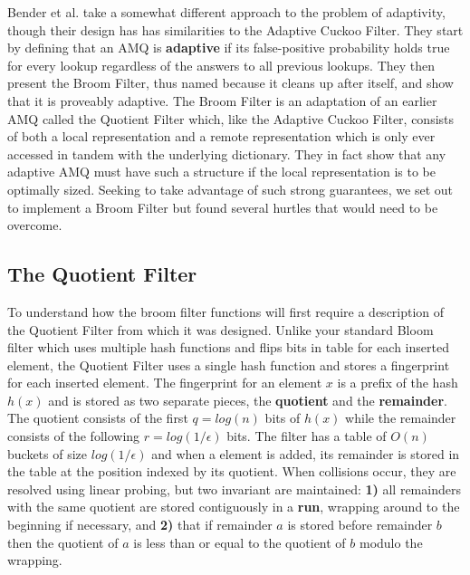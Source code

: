 \documentclass[../paper.tex]{subfiles}
\begin{document}
	Bender et al. \cite{broom-filter} take a somewhat different approach to the problem of adaptivity, though their design has has similarities to the Adaptive Cuckoo Filter.  They start by defining that an AMQ is {\bf adaptive} if its false-positive probability holds true for every lookup regardless of the answers to all previous lookups.  They then present the Broom Filter, thus named because it cleans up after itself, and show that it is proveably adaptive.  The Broom Filter is an adaptation of an earlier AMQ called the Quotient Filter \cite{quotient-filter} which, like the Adaptive Cuckoo Filter, consists of both a local representation and a remote representation which is only ever accessed in tandem with the underlying dictionary.   They in fact show that any adaptive AMQ must have such a structure if the local representation is to be optimally sized.  Seeking to take advantage of such strong guarantees, we set out to implement a Broom Filter but found several hurtles that would need to be overcome.  
	
\subsection{The Quotient Filter}
	To understand how the broom filter functions will first require a description of the Quotient Filter from which it was designed.   Unlike your standard Bloom filter which uses multiple hash functions and flips bits in table for each inserted element, the Quotient Filter uses a single hash function and stores a fingerprint for each inserted element.  The fingerprint for an element $x$ is a prefix of the hash $h(x)$ and is stored as two separate pieces, the {\bf quotient} and the {\bf remainder}.  The quotient consists of the first $q = log(n)$ bits of $h(x)$ while the remainder consists of the following $r = log(1/\epsilon)$ bits.  The filter has a table of $O(n)$ buckets of size $log(1/\epsilon)$ and when a element is added, its remainder is stored in the table at the position indexed by its quotient.  When collisions occur, they are resolved using linear probing, but two invariant are maintained: {\bf 1)} all remainders with the same quotient are stored contiguously in a {\bf run}, wrapping around to the beginning if necessary, and {\bf 2)} that if remainder $a$ is stored before remainder $b$ then the quotient of $a$ is less than or equal to the quotient of $b$ modulo the wrapping.  
\end{document}

